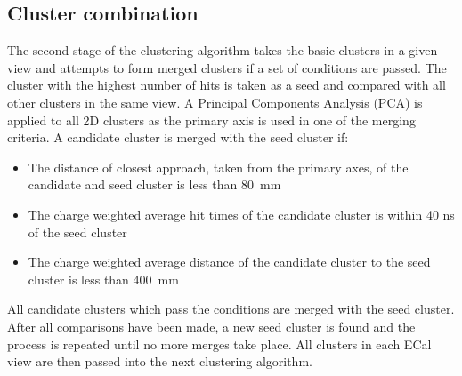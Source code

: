 \subsection{Cluster combination}
\label{subsec:ECalCombineClusters}
The second stage of the clustering algorithm takes the basic clusters in a given view and attempts to form merged clusters if a set of conditions are passed.  The cluster with the highest number of hits is taken as a seed and compared with all other clusters in the same view.  A Principal Components Analysis (PCA) is applied to all 2D clusters as the primary axis is used in one of the merging criteria.  A candidate cluster is merged with the seed cluster if:
\begin{itemize}
  \item The distance of closest approach, taken from the primary axes, of the candidate and seed cluster is less than 80~mm
  \item The charge weighted average hit times of the candidate cluster is within 40 ns of the seed cluster
  \item The charge weighted average distance of the candidate cluster to the seed cluster is less than 400~mm
\end{itemize}
All candidate clusters which pass the conditions are merged with the seed cluster.  After all comparisons have been made, a new seed cluster is found and the process is repeated until no more merges take place.  All clusters in each ECal view are then passed into the next clustering algorithm.



